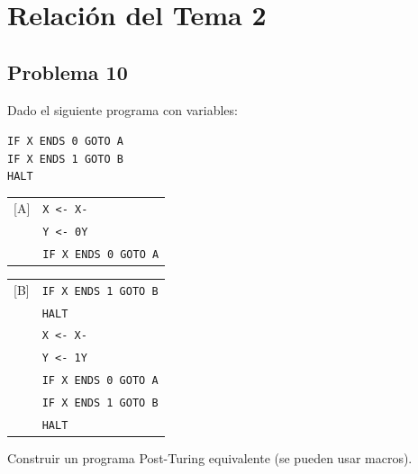 \section{Relación del Tema 2}
\subsection*{Problema 10}

Dado el siguiente programa con variables:

\begin{flushleft}
\hspace*{2em}\texttt{IF X ENDS 0 GOTO A} \\
\hspace*{2em}\texttt{IF X ENDS 1 GOTO B} \\
\hspace*{2em}\texttt{HALT}

\vspace{0.5em}
\begin{tabular}{@{}l l@{}}
[A] & \texttt{X <- X-} \\
	& \texttt{Y <- 0Y} \\
	& \texttt{IF X ENDS 0 GOTO A}
\end{tabular}

\vspace{0.8em}
\begin{tabular}{@{}l l@{}}
[B] & \texttt{IF X ENDS 1 GOTO B} \\
	& \texttt{HALT} \\
	& \texttt{X <- X-} \\
	& \texttt{Y <- 1Y} \\
	& \texttt{IF X ENDS 0 GOTO A} \\
	& \texttt{IF X ENDS 1 GOTO B} \\
	& \texttt{HALT}
\end{tabular}
\end{flushleft}

Construir un programa Post-Turing equivalente (se pueden usar macros).